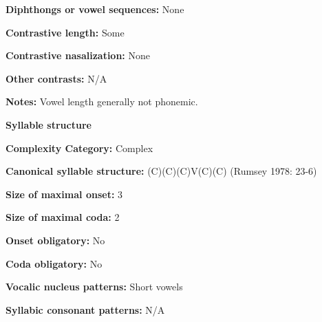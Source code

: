 \begin{styleBody}
\textbf{Diphthongs or vowel sequences:} None
\end{styleBody}

\begin{styleBody}
\textbf{Contrastive length:} Some
\end{styleBody}

\begin{styleBody}
\textbf{Contrastive nasalization:} None
\end{styleBody}

\begin{styleBody}
\textbf{Other contrasts:} N/A
\end{styleBody}

\begin{styleBody}
\textbf{Notes:} Vowel length generally not phonemic.
\end{styleBody}

\begin{styleBody}
\textbf{Syllable structure}
\end{styleBody}

\begin{styleBody}
\textbf{Complexity Category:} Complex
\end{styleBody}

\begin{styleBody}
\textbf{Canonical syllable structure:} (C)(C)(C)V(C)(C)\textbf{ }(Rumsey 1978: 23-6)
\end{styleBody}

\begin{styleBody}
\textbf{Size of maximal onset:} 3
\end{styleBody}

\begin{styleBody}
\textbf{Size of maximal coda:} 2
\end{styleBody}

\begin{styleBody}
\textbf{Onset obligatory:} No
\end{styleBody}

\begin{styleBody}
\textbf{Coda obligatory:} No
\end{styleBody}

\begin{styleBody}
\textbf{Vocalic nucleus patterns:} Short vowels
\end{styleBody}

\begin{styleBody}
\textbf{Syllabic consonant patterns:} N/A
\end{styleBody}

